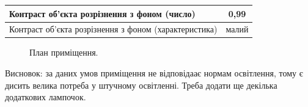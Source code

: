 \documentclass[a4paper,14pt]{extreport}
\begin{document}
\begin{landscape}
\begin{table}[h]
\begin{center}
\begin{tabular}{|l|c|c|c|c|}
        Контраст об’єкта розрізнення з фоном (число)                                                                                               & \multicolumn{4}{c|}{0,99}                 \\ \hline
        Контраст об’єкта розрізнення з фоном (характеристика)                                                                                      & \multicolumn{4}{c|}{малий}                 \\ \hline
        \end{tabular}
         \end{center} 
    \end{table}
 
  
\begin{figure}[h!]
\caption{План приміщення.}
\end{figure}

\end{landscape}

Висновок:  за даних умов приміщення не відповідаає нормам освітлення, тому є дисить велика потреба у штучному освітленні. Треба додати ще декілька додаткових лампочок.
\end{document}
